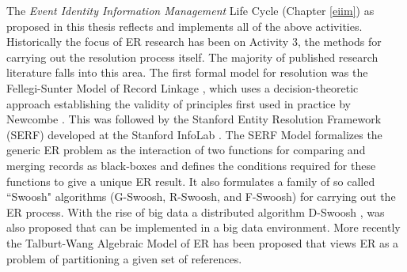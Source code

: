 The \textit{Event Identity Information Management} Life Cycle (Chapter \ref{eiim}) as proposed in this thesis reflects and implements all of the above activities. Historically the focus of ER research has been on Activity 3, the methods for carrying out the resolution process itself. The majority of published research literature falls into this area. The first formal model for resolution was the Fellegi-Sunter Model of Record Linkage \cite{fellegi1969theory}, which uses a decision-theoretic approach establishing the validity of principles first used in practice by Newcombe \cite{newcombe1959automatic}.  This was followed by the Stanford Entity Resolution Framework (SERF) developed at the Stanford InfoLab \cite{benjelloun2006generic}.  The SERF Model formalizes the generic ER problem as the interaction of two functions for comparing and merging records as black-boxes and defines the conditions required for these functions to give a unique ER result. It also formulates a family of so called ``Swoosh" algorithms (G-Swoosh, R-Swoosh, and F-Swoosh) for carrying out the ER process. With the rise of big data a distributed algorithm D-Swoosh \cite{benjelloun2007d}, was also proposed that can be implemented in a big data environment. More recently the Talburt-Wang Algebraic Model of ER has been proposed \cite{talburt2007algebraic} that views ER as a problem of partitioning a given set of references. 
 
